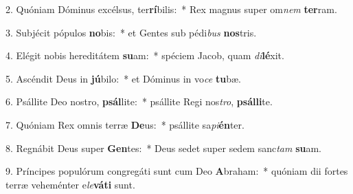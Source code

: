 2. Quóniam Dóminus excélsus, ter\textbf{rí}bilis:~*  Rex magnus super om\textit{nem} \textbf{ter}ram.\

3. Subjécit pópulos \textbf{no}bis:~*  et Gentes sub pédi\textit{bus} \textbf{nos}tris.\

4. Elégit nobis hereditátem \textbf{su}am:~*  spéciem Jacob, quam \textit{di}\textbf{lé}xit.\

5. Ascéndit Deus in \textbf{jú}bilo:~*  et Dóminus in vo\textit{ce} \textbf{tu}bæ.\

6. Psállite Deo nostro, \textbf{psál}lite:~*  psállite Regi nos\textit{tro}, \textbf{psál}\textbf{li}te.\

7. Quóniam Rex omnis terræ \textbf{De}us:~*  psállite sa\textit{pi}\textbf{én}ter.\

8. Regnábit Deus super \textbf{Gen}tes:~*  Deus sedet super sedem sanc\textit{tam} \textbf{su}am.\

9. Príncipes populórum congregáti sunt cum Deo \textbf{A}braham:~*  quóniam dii fortes terræ veheménter e\textit{le}\textbf{vá}\textbf{ti} sunt.\

